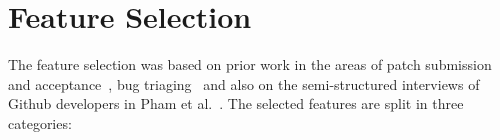 \documentclass{acm_proc_article-sp}
\begin{document}
%



\section{Feature Selection}
\label{sec:featureselection}

The feature selection was based on prior work in the areas of patch submission
and acceptance~\cite{Nagap05,Bird07a,Weiss08,Jeong09,Baysa12}, bug
triaging~\cite{Anvik06, Giger10} and also on the semi-structured interviews of
Github developers in Pham et al.~\cite{Pham13}. The selected features are split
in three categories:
\end{document}
